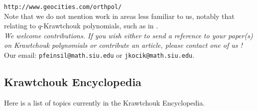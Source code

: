 \documentclass[12pt]{article}
\numberwithin{equation}{section}
\begin{document}
{\tt http://www.geocities.com/orthpol/}\\

Note that we do not mention work in areas less familiar to us, 
notably that relating to $q$-Krawtchouk polynomials, such as in \cite{St}.\\


{\it We welcome contributions. If you wish either to send a reference to your paper(s)
on Krawtchouk polynomials or contribute an article, please contact one of us ! }\\

Our email: {\tt pfeinsil@math.siu.edu} or {\tt jkocik@math.siu.edu}.\\

\subsection{Krawtchouk Encyclopedia}

Here is a list of topics currently in the Krawtchouk Encyclopedia.\\
\end{document}
